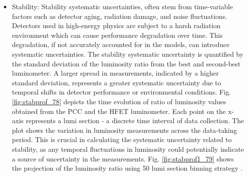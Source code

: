 \begin{itemize}
  
\item Stability: Stability systematic uncertainties, often stem from time-variable factors such as detector aging, radiation damage, and noise fluctuations. Detectors used in high-energy physics are subject to a harsh radiation environment which can cause performance degradation over time. This degradation, if not accurately accounted for in the models, can introduce systematic uncertainties. %
  The stability systematic uncertainty is quantified by the standard deviation of the luminosity ratio from the best and second-best luminometer. A larger spread in measurements, indicated by a higher standard deviation, represents a greater systematic uncertainty due to temporal shifts in detector performance or environmental conditions. Fig. \ref{fig:stabprof_78} depicts the time evolution of ratio of luminosity values obtained from the PCC and the HFET luminometer. Each point on the x-axis represents a lumi section - a discrete time interval of data collection. The plot shows the variation in luminosity measurements across the data-taking period. This is crucial in calculating the systematic uncertainty related to stability, as any temporal fluctuations in luminosity could potentially indicate a source of uncertainty in the measurements. %
Fig. \ref{fig:stabprof1_79} shows the projection of the luminosity ratio using 50 lumi section binning strategy \cite{pas_22}. %

  

\end{itemize}
